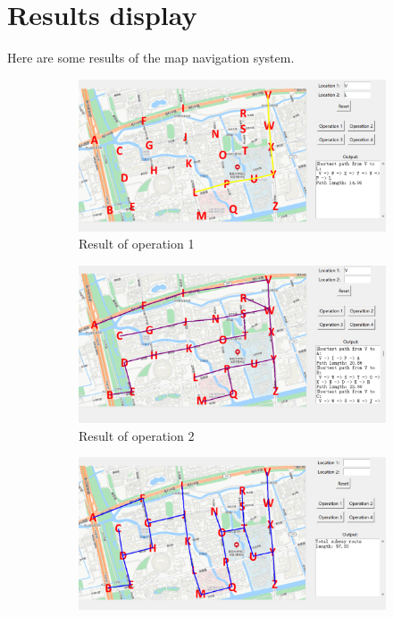 \documentclass[UTF8]{ctexart}
\begin{document}
\section{Results display}
Here are some results of the map navigation system.\\
\begin{figure}[htbp]
    \centering
    \begin{subfigure}{0.45\textwidth}
        \centering
    \includegraphics[width=\textwidth]{op1.png}
    \caption{Result of operation 1}
    \end{subfigure}%
    \hfill
    \begin{subfigure}{0.45\textwidth}
        \centering
    \includegraphics[width=\textwidth]{op2.png}
    \caption{Result of operation 2}
    \end{subfigure}%
    \vspace{0.5cm}
    \begin{subfigure}{0.45\textwidth}
        \centering
    \includegraphics[width=\textwidth]{op3.png}

\end{subfigure}
\end{figure}
\end{document}
